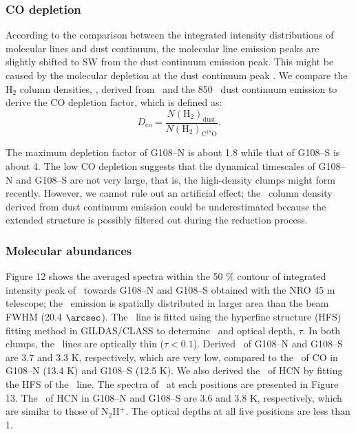 \documentclass[manuscript]{aastex}
\begin{document}
\subsubsection{CO depletion}
According to the comparison between the integrated intensity distributions of molecular lines and dust continuum, the molecular line emission peaks are slightly shifted to SW from the dust continuum emission peak.
This might be caused by the molecular depletion at the dust continuum peak \citep{lee03}.
We compare the H$_{2}$ column densities, \cd, derived from \ceot\ and the 850 \m\ dust continuum emission to derive the CO depletion factor, which is defined as:
\begin{equation}
D_{\textrm{co}}= \frac{N({\textrm{H}}_2)_{\textrm{dust}}}{N({\textrm{H}}_2)_{{\textrm{C}}^{18}{\textrm{O}}}}.
\end{equation}


The maximum depletion factor of G108--N is about 1.8 while that of G108--S is about 4.
The low CO depletion suggests that the dynamical timescales of G108--N and G108--S are not very large, that is, the high-density clumps might form recently.
However, we cannot rule out an artificial effect; the \atomh\ column density derived from dust continuum emission could be underestimated because the extended structure is possibly filtered out during the reduction process.


\subsubsection{Molecular abundances}

Figure 12 shows the averaged spectra within the 50 $\%$ contour of integrated intensity peak of \nhp\ towards G108--N and G108--S obtained with the NRO 45 m telescope; the \nhp\ emission is spatially distributed in larger area than the beam FWHM (20.4 $\arcsec$).
The \nhp\ line is fitted using the hyperfine structure (HFS) fitting method in GILDAS/CLASS to determine \tex\ and optical depth, $\tau$.
In both clumps, the \nhp\ lines are optically thin ($\tau < 0.1$).
Derived \tex\ of G108--N and G108--S are 3.7 and 3.3 K, respectively, which are very low, compared to the \tex\ of CO in G108--N (13.4 K) and G108--S (12.5 K).
We also derived the \tex\ of HCN by fitting the HFS of the \hcn\ line.
The spectra of \hcn\ at each positions are presented in Figure 13.
The \tex\ of HCN in G108--N and G108--S are 3.6 and 3.8 K, respectively, which are similar to those of N$_{2}$H$^{+}$.
The optical depths at all five positions are less than 1.
\end{document}
